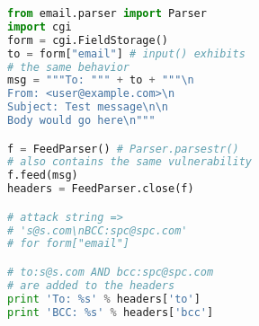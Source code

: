 \begin{lstlisting}[language=Python,caption={Python program with e-mail
      header injection vulnerability.},label={code:pyemi}, float]
from email.parser import Parser
import cgi
form = cgi.FieldStorage()
to = form["email"] # input() exhibits 
# the same behavior
msg = """To: """ + to + """\n
From: <user@example.com>\n
Subject: Test message\n\n
Body would go here\n"""

f = FeedParser() # Parser.parsestr() 
# also contains the same vulnerability
f.feed(msg)
headers = FeedParser.close(f)

# attack string => 
# 's@s.com\nBCC:spc@spc.com'
# for form["email"]

# to:s@s.com AND bcc:spc@spc.com 
# are added to the headers
print 'To: %s' % headers['to']
print 'BCC: %s' % headers['bcc']
\end{lstlisting}
